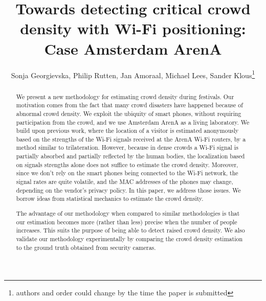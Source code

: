 \documentclass[10pt,a4paper]{article}
\begin{document}
\title{Towards detecting critical crowd density with Wi-Fi positioning: Case Amsterdam ArenA}
\author{Sonja Georgievska, Philip Rutten, Jan Amoraal, Michael Lees, Sander Klous\footnote{authors and order could change by the time the paper is submitted}}
\maketitle

\begin{abstract}

We present a new methodology for estimating crowd density during festivals. Our motivation comes from the fact that many crowd disasters have happened because of abnormal crowd density. We exploit the ubiquity of smart phones, without requiring participation from the crowd, and we use Amsterdam ArenA as a living laboratory. We build upon previous work, where the location of a visitor is estimated anonymously based on the strengths of the Wi-Fi signals received at the ArenA Wi-Fi routers,  by a method similar to trilateration. However, because in dense crowds a Wi-Fi signal is partially absorbed and partially reflected by the human bodies, the localization based on signals strengths alone does not suffice to estimate the crowd density. Moreover, since we don't rely on the smart phones being connected to the Wi-Fi network, the signal rates are quite volatile, and the MAC addresses of the phones may change, depending on the vendor's privacy policy. In this paper, we address those issues. We borrow ideas from statistical mechanics to estimate the crowd density.  
The advantage of our methodology when compared to similar methodologies is that our estimation becomes more (rather than less) precise when the number of people increases. This suits the purpose of being able to detect raised crowd density. 
We also validate our methodology experimentally by comparing the crowd density estimation to the ground truth obtained from security cameras. 
	

\end{abstract}
\end{document}
